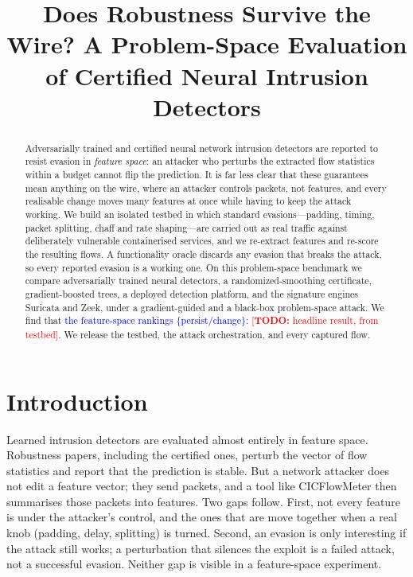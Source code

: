 \documentclass[letterpaper,twocolumn,10pt]{article}
\newcommand{\todo}[1]{\textcolor{red}{[\textbf{TODO:} #1]}}
\newcommand{\fromtestbed}[1]{\textcolor{blue}{#1}}  %
\begin{document}
\title{\Large \bf Does Robustness Survive the Wire? A Problem-Space Evaluation of
Certified Neural Intrusion Detectors}
\author{}         %
\date{}
\maketitle
\thispagestyle{empty}

\begin{abstract}
Adversarially trained and certified neural network intrusion detectors are
reported to resist evasion in \emph{feature space}: an attacker who perturbs the
extracted flow statistics within a budget cannot flip the prediction. It is far
less clear that these guarantees mean anything on the wire, where an attacker
controls packets, not features, and every realisable change moves many features
at once while having to keep the attack working. We build an isolated testbed in
which standard evasions---padding, timing, packet splitting, chaff and
rate shaping---are carried out as real traffic against deliberately vulnerable
containerised services, and we re-extract features and re-score the resulting
flows. A functionality oracle discards any evasion that breaks the attack, so
every reported evasion is a working one. On this problem-space benchmark we
compare adversarially trained neural detectors, a randomized-smoothing
certificate, gradient-boosted trees, a deployed detection platform, and the
signature engines Suricata and Zeek, under a gradient-guided and a black-box
problem-space attack. We find that \fromtestbed{the feature-space rankings
\{persist/change\}}: \todo{headline result, from testbed}. We release the
testbed, the attack orchestration, and every captured flow.
\end{abstract}

\section{Introduction}
Learned intrusion detectors are evaluated almost entirely in feature space.
Robustness papers, including the certified ones, perturb the vector of flow
statistics and report that the prediction is stable. But a network attacker does
not edit a feature vector; they send packets, and a tool like CICFlowMeter then
summarises those packets into features. Two gaps follow. First, not every
feature is under the attacker's control, and the ones that are move together when
a real knob (padding, delay, splitting) is turned. Second, an evasion is only
interesting if the attack still works; a perturbation that silences the exploit
is a failed attack, not a successful evasion. Neither gap is visible in a
feature-space experiment.
\end{document}
